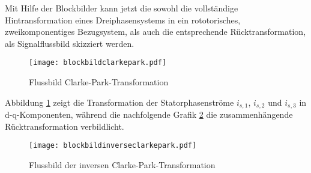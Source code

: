 Mit Hilfe der Blockbilder kann jetzt die sowohl die vollständige Hintransformation eines Dreiphasensystems in ein rototorisches, zweikomponentiges Bezugsystem, als auch die entsprechende Rücktransformation, als Signalflussbild skizziert werden.

\begin{figure}[h]
	\centering
	\texttt{[image: blockbildclarkepark.pdf]}
	\label{fig:blockbildclarkepark}
	\caption{Flussbild Clarke-Park-Transformation}
\end{figure}

Abbildung \ref{fig:blockbildclarkepark} zeigt die Transformation der Statorphasenströme $i_{s,1}$, $i_{s,2}$ und $i_{s,3}$ in d-q-Komponenten, während die nachfolgende Grafik \ref{fig:blockbildinverseclarkepark} die zusammenhängende Rücktransformation verbildlicht.

\begin{figure}[h]
	\centering
	\texttt{[image: blockbildinverseclarkepark.pdf]}
	\label{fig:blockbildinverseclarkepark}
	\caption{Flussbild der inversen Clarke-Park-Transformation}
\end{figure}


 
